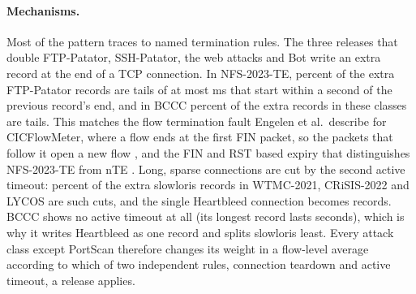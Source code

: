 \documentclass[pdflatex,sn-mathphys-num]{sn-jnl}
\theoremstyle{thmstyleone}%
\theoremstyle{thmstylethree}%
\begin{document}
\paragraph{Mechanisms.} Most of the pattern traces to named termination rules. The three releases that double FTP-Patator, SSH-Patator, the web attacks and Bot write an extra record at the end of a TCP connection. In NFS-2023-TE, \RQoneTailFtpTe{} percent of the extra FTP-Patator records are tails of at most \SetTailMs{} ms that start within a second of the previous record's end, and in BCCC \RQoneTailBccc{} percent of the extra records in these classes are tails. This matches the flow termination fault Engelen et al.\ describe for CICFlowMeter, where a flow ends at the first FIN packet, so the packets that follow it open a new flow \cite{engelen2021}, and the FIN and RST based expiry that distinguishes NFS-2023-TE from nTE \cite{pekar2024}. Long, sparse connections are cut by the \NactiveTimeout{} second active timeout: \RQoneCutSlowloris{} percent of the extra slowloris records in WTMC-2021, CRiSIS-2022 and LYCOS are such cuts, and the single Heartbleed connection becomes \RQoneHeartbleedCut{} records. BCCC shows no active timeout at all (its longest record lasts \RQoneBcccLongest{} seconds), which is why it writes Heartbleed as one record and splits slowloris least. Every attack class except PortScan therefore changes its weight in a flow-level average according to which of two independent rules, connection teardown and active timeout, a release applies.
\end{document}
